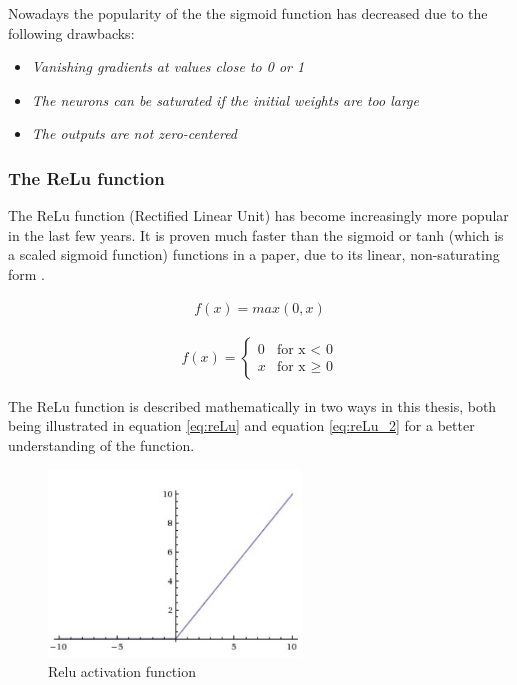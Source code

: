 \documentclass[USenglish]{ifimaster}  %
\begin{document}
Nowadays the popularity of the the sigmoid function has decreased due to the following drawbacks:
\begin{itemize}
    \item \textit{Vanishing gradients at values close to 0 or 1}
    \item \textit{The neurons can be saturated if the initial weights are too large}
    \item \textit{The outputs are not zero-centered}
\end{itemize}

\subsubsection{The ReLu function}
The ReLu function (Rectified Linear Unit) has become increasingly more popular in the last few years. It is proven much faster than the sigmoid or tanh (which is a scaled sigmoid function) functions in a paper, due to its linear, non-saturating form \cite{website:relu}. 

\begin{equation}\label{eq:reLu}
\begin{aligned}
f(x) = max(0,x)
\end{aligned}
\end{equation}

\begin{equation}\label{eq:reLu_2}
\begin{aligned}
{f(x) = 
\begin{cases}
    0 & \text{for x < 0}  \\
    x & \text{for x $\geq$ 0}
\end{cases}}
\end{aligned}
\end{equation}

The ReLu function is described mathematically in two ways in this thesis, both being illustrated in equation \cref{eq:reLu} and equation \cref{eq:reLu_2} for a better understanding of the function.

\begin{figure}[ht]
    \centering
    \includegraphics[width=0.6\textwidth]{bilder/relu_activation.png}
    \caption{Relu activation function \cite{website:cs231n_activation_functions}}
    \label{fig:relu}
\end{figure}
\end{document}
